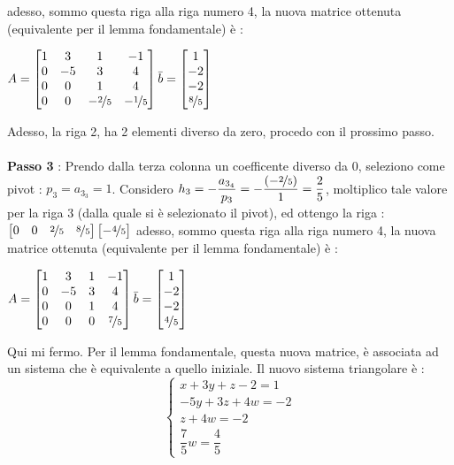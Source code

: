 \documentclass[12pt, letterpaper]{article}
\newcommand{\acc}{\\\hphantom{}\\}
\begin{document}
adesso, sommo questa riga alla riga numero 4, la nuova matrice ottenuta (equivalente per 
il lemma fondamentale) è :
\begin{center}\(
    A=\begin{bmatrix}
        1&3&1&-1\\
        0&-5&3&4\\
        0&0&1&4\\
        0&0&-\nicefrac{2}{5}&-\nicefrac{1}{5}
    \end{bmatrix}\bar b = \begin{bmatrix}
        1\\
        -2\\
        -2\\
        \nicefrac{8}{5}
    \end{bmatrix}
\)\end{center}
Adesso, la riga 2, ha 2 elementi diverso da zero, procedo con il prossimo passo.\acc 
\textbf{Passo 3} :
Prendo dalla terza colonna un coefficente diverso da 0, seleziono come 
pivot : \(p_3=a_{3_3}=1\).
Considero \(h_3 = -\dfrac{a_{3_4}}{p_3}=-\dfrac{(-\nicefrac{2}{5})}{1}=\dfrac{2}{5}\),  moltiplico tale valore per la 
riga \(3\) (dalla quale si è selezionato il pivot), ed ottengo la riga : \(\begin{bmatrix}
    0&0&\nicefrac{2}{5}&\nicefrac{8}{5}
\end{bmatrix}\begin{bmatrix}
    -\nicefrac{4}{5}
\end{bmatrix}\)
adesso, sommo questa riga alla riga numero 4, la nuova matrice ottenuta (equivalente per 
il lemma fondamentale) è :
\begin{center}\(
    A=\begin{bmatrix}
        1&3&1&-1\\
        0&-5&3&4\\
        0&0&1&4\\
        0&0&0&\nicefrac{7}{5}
    \end{bmatrix}\bar b = \begin{bmatrix}
        1\\
        -2\\
        -2\\
        \nicefrac{4}{5}
    \end{bmatrix}
\)\end{center}
Qui mi fermo. Per il lemma fondamentale, questa nuova matrice, è associata ad un sistema che è equivalente a quello 
iniziale. Il nuovo sistema triangolare è : 
\begin{equation}
    \begin{cases}
        x+3y+z-2=1\\ 
        -5y+3z+4w=-2 \\
        z+4w = -2\\  
        \dfrac{7}{5}w=\dfrac{4}{5}
    \end{cases}
\end{equation}
\end{document}
